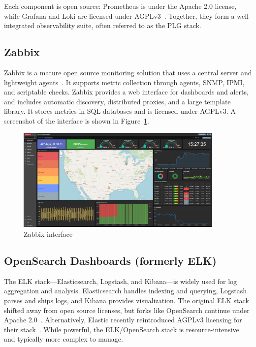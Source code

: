 Each component is open source: Prometheus is under the Apache 2.0 license, while Grafana and Loki are licensed under AGPLv3~\cite{grafana_license_change}. Together, they form a well-integrated observability suite, often referred to as the PLG stack.

\subsection*{Zabbix}
Zabbix is a mature open source monitoring solution that uses a central server and lightweight agents~\cite{zabbix_web}. It supports metric collection through agents, SNMP, IPMI, and scriptable checks. Zabbix provides a web interface for dashboards and alerts, and includes automatic discovery, distributed proxies, and a large template library. It stores metrics in SQL databases and is licensed under AGPLv3. A screenshot of the interface is shown in Figure~\ref{fig:zabbix-ui}.

\begin{figure}[H]
  \centering
  \includegraphics[width=0.9\textwidth]{imaxes/zabbix-ui.png}
  \caption{Zabbix interface}
  \label{fig:zabbix-ui}
\end{figure}

\subsection*{OpenSearch Dashboards (formerly ELK)}
The ELK stack—Elasticsearch, Logstash, and Kibana—is widely used for log aggregation and analysis. Elasticsearch handles indexing and querying, Logstash parses and ships logs, and Kibana provides visualization. The original ELK stack shifted away from open source licenses, but forks like OpenSearch continue under Apache 2.0~\cite{opensearch_web}. Alternatively, Elastic recently reintroduced AGPLv3 licensing for their stack~\cite{elastic_license}. While powerful, the ELK/OpenSearch stack is resource-intensive and typically more complex to manage.

